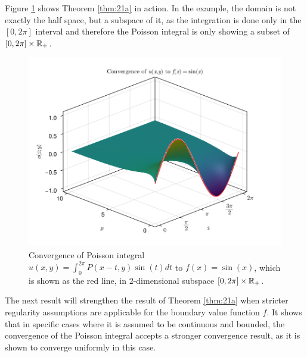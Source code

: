 Figure \ref{fig:convergence} shows Theorem \ref{thm:21a} in action. In the example, the domain is not exactly the half space, but a subspace of it, as the integration is done only in the $[0,2\pi]$ interval and therefore the Poisson integral is only showing a subset of $[0,2\pi]\times\mathbb R_+$.

\begin{figure}[h]
\centering
\includegraphics[width=\textwidth]{Figures/convergence.png}
\caption{Convergence of Poisson integral $u(x,y)=\int_0^{2\pi}P(x-t,y)\sin(t)dt$ to $f(x)=\sin(x)$, which is shown as the red line, in 2-dimensional subspace $[0,2\pi]\times\mathbb R_+$.}
\label{fig:convergence}
\end{figure}

The next result will strengthen the result of Theorem \ref{thm:21a} when stricter regularity assumptions are applicable for the boundary value function $f$. It shows that in specific cases where it is assumed to be continuous and bounded, the convergence of the Poisson integral accepts a stronger convergence result, as it is shown to converge uniformly in this case.

